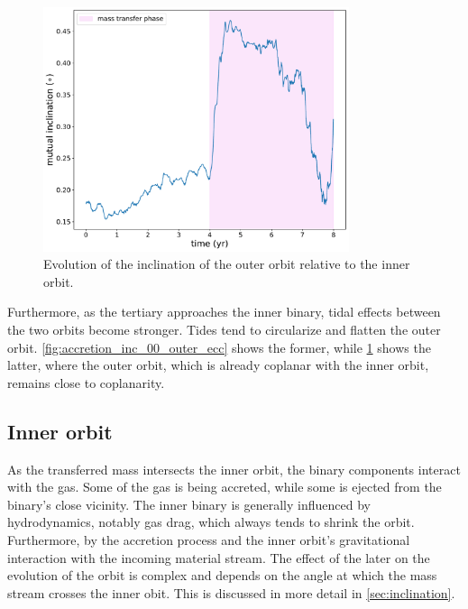 \begin{figure}[H]
    \centering
    \includegraphics[width=0.8\textwidth]{Thesis/graphs/inc_00/accretion_inc_00_inc.pdf}
    \caption{Evolution of the inclination of the outer orbit relative to the inner orbit.}
    \label{fig:accretion_inc_00_inc}
\end{figure}
Furthermore, as the tertiary approaches the inner binary, tidal effects between the two orbits become stronger. Tides tend to circularize and flatten the outer orbit. \cref{fig:accretion_inc_00_outer_ecc} shows the former, while \cref{fig:accretion_inc_00_inc} shows the latter, where the outer orbit, which is already coplanar with the inner orbit, remains close to coplanarity.


\subsection{Inner orbit}

As the transferred mass intersects the inner orbit, the binary components interact with the gas. Some of the gas is being accreted, while some is ejected from the binary's close vicinity. The inner binary is generally influenced by hydrodynamics, notably gas drag, which always tends to shrink the orbit. Furthermore, by the accretion process and the inner orbit's gravitational interaction with the incoming material stream. The effect of the later on the evolution of the orbit is complex and depends on the angle at which the mass stream crosses the inner obit. This is discussed in more detail in \cref{sec:inclination}. 


